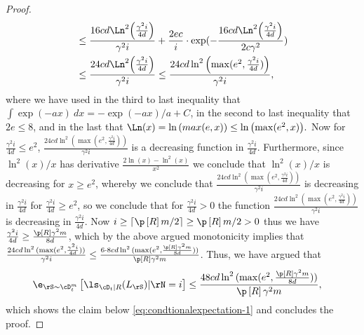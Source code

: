 \begin{proof}
\begin{align*}
        &\leq \frac{16cd\Ln^{2}{\left( \frac{\gamma^{2}i}{4d}\right)}}{\gamma^{2}i}+
        \frac{2ec}{i} \cdot \exp(-\frac{16cd\Ln^{2}{\left( \frac{\gamma^{2}i}{4d}\right)}}{2c\gamma^{2}} ) 
        \\
        &\leq 
        \frac{24cd\Ln^{2}{\left( \frac{\gamma^{2}i}{4d}\right)}}{\gamma^{2}i}
        \leq\frac{24cd\ln^{2}{\left( \max(e^{2},\frac{\gamma^{2}i}{4d})\right)}}{\gamma^{2}i},
    \end{align*}
    where we have used in the third to last inequality that $ \int\exp(-ax) \ dx= -\exp(-ax)/a +C$, in the second to last inequality that $ 2e\leq 8 $, and in the last that $ \Ln(x)=\ln{\left(max(e,x) \right)}\leq\ln{\left(\max(e^{2},x)  \right)}.$ Now for $ \frac{\gamma^{2}i}{4d}\leq e^{2}  $, $ \frac{24cd\ln^{2}{( \max(e^{2},\frac{\gamma^{2}i}{4d}))}}{\gamma^{2}i} $  is a decreasing function in $ \frac{\gamma^{2}i}{4d}$. Furthermore, since $ \ln^2{\left(x \right)}/x $ has derivative $ \frac{2\ln{\left(x \right)}-\ln^2{\left(x \right)}}{x^2} $ we conclude that $ \ln^2{\left(x \right)}/x $ is decreasing for $ x\geq e^{2} $, whereby we conclude that $ \frac{24cd\ln^{2}{( \max(e^{2},\frac{\gamma^{2}i}{4d}))}}{\gamma^{2}i} $ is decreasing in $ \frac{\gamma^{2}i}{4d} $ for $ \frac{\gamma^{2}i}{4d} \geq e^{2}$, so we conclude that for $ \frac{\gamma^{2}i}{4d} >0 $ the function $ \frac{24cd\ln^{2}{( \max(e^{2},\frac{\gamma^{2}i}{4d}))}}{\gamma^{2}i} $ is decreasing in $ \frac{\gamma^{2}i}{4d}  $. Now $ i\geq \left\lceil\p\left[R\right]m/2\right\rceil\geq \p\left[R\right]m/2 >0$ thus we have $ \frac{\gamma^{2}i}{4d}\geq \frac{\p\left[R\right]\gamma^{2}m}{8d}$, which by the above argued monotonicity implies that $ \frac{24cd\ln^{2}{( \max(e^{2},\frac{\gamma^{2}i}{4d}))}}{\gamma^{2}i} \leq \frac{6\cdot8 cd\ln^{2}{( \max(e^{2},\frac{\p\left[R\right]\gamma^{2}m}{8d}))}}{\p\left[R\right]\gamma^{2}m} $. Thus, we have argued that 
    \begin{align*}
        &\e_{\rS\sim\cD_{t}^{m}}\left[\ls_{\cD_{t}|R}(L_{\rS})|\rN=i\right]
        \leq \frac{48 cd\ln^{2}{( \max(e^{2},\frac{\p\left[R\right]\gamma^{2}m}{8d}))}}{\p\left[R\right]\gamma^{2}m},
    \end{align*}
    which shows the claim below \cref{eq:condtionalexpectation-1} and concludes the proof. 
\end{proof}